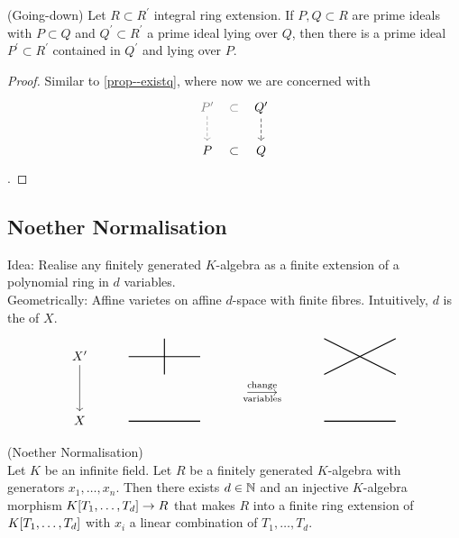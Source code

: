 \documentclass[a4paper,11pt]{article}
\begin{document}
			\begin{prop}(Going-down)
				Let $R\subset R^\prime$ integral ring extension. If $P,Q\subset R$ are prime ideals with $P\subset Q$ and $Q^\prime \subset R^\prime$ a prime ideal lying over $Q$, then there is a prime ideal $P^\prime\subset R^\prime $ contained in $Q^\prime $ and lying over $P$.
			\end{prop}
			\begin{proof}\renewcommand{\qedsymbol}{}
				Similar to \autoref{prop--existq}, where now we are concerned with 
				\begin{equation*}
					\begin{tikzcd}
						{\color{gray}P^\prime}\ar[d,dashed,gray]\ar[r,phantom,"\subset",description,gray] & Q^\prime\ar[d,dashed]\\
						P\ar[r,phantom,"\subset"] & Q
					\end{tikzcd}
				\end{equation*}.
			\end{proof}\renewcommand{\qedsymbol}{$\square$}

			
		\subsection{Noether Normalisation}

			\noindent Idea: Realise any finitely generated $K$-algebra as a finite extension of a polynomial ring in $d$ variables.
			\\
			
			\noindent Geometrically: Affine varietes  on affine $d$-space with finite fibres. Intuitively, $d$ is the  of $X$.
			\begin{equation*}
				\begin{tikzcd}[row sep=small]
					X^\prime\ar[dd] & \tikz[baseline=-.1cm]{\draw[thick](-1,0)--(1,0);\draw[thick](0,.5)--(0,-.5)} & & & \tikz[baseline=-.1cm]{\draw[thick](-1,.5)--(1,-.5);\draw[thick](-1,-.5)--(1,.5)}\\
					& & \ar[r,"\mathrm{change}","\mathrm{variables}"'] &\phantom{} & \\
					X & \tikz[baseline=-.1cm]{\draw[thick](-1,0)--(1,0)} & & & \tikz[baseline=-.1cm]{\draw[thick](-1,0)--(1,0)}
				\end{tikzcd}
			\end{equation*}

			\begin{thm}\label{thm--noether}
				(Noether Normalisation)\\ Let $K$ be an infinite field. Let $R$ be a finitely generated $K$-algebra with generators $x_1,\dots,x_n$. Then there exists $d\in\mathbb{N}$ and an injective $K$-algebra morphism $K[T_1,\dots,T_{d}]\rightarrow R$ that makes $R$ into a finite ring extension of $K[T_1,\dots,T_{d}]$ with $x_i$ a linear combination of $T_1,\dots,T_d$.
			\end{thm}
\end{document}
